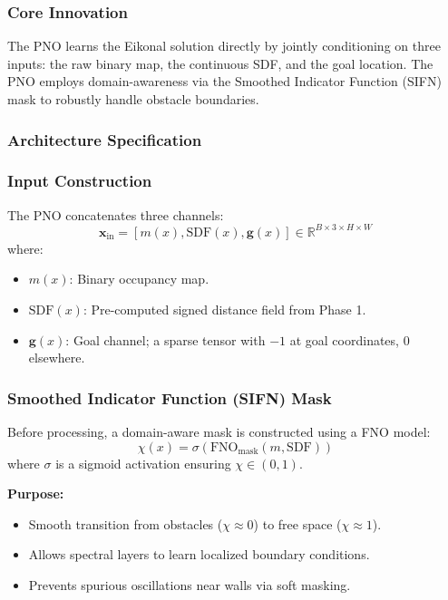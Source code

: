 \documentclass[11pt,a4paper]{article}
\theoremstyle{definition}
\begin{document}
\subsubsection{Core Innovation}
The PNO learns the Eikonal solution directly by jointly conditioning on three inputs:
the raw binary map, the continuous SDF, and the goal location. 
The PNO employs domain-awareness via the Smoothed Indicator Function (SIFN) mask to robustly handle obstacle boundaries.

\subsubsection{Architecture Specification}

\subsubsection{Input Construction}

The PNO concatenates three channels:
\[
  \mathbf{x}_{\text{in}} = [m(x), \text{SDF}(x), \mathbf{g}(x)] \in \mathbb{R}^{B \times 3 \times H \times W}
\]
where:
\begin{itemize}
  \item $m(x)$: Binary occupancy map.
  \item $\text{SDF}(x)$: Pre-computed signed distance field from Phase 1.
  \item $\mathbf{g}(x)$: Goal channel; a sparse tensor with $-1$ at goal coordinates, $0$ elsewhere.
\end{itemize}

\subsubsection{Smoothed Indicator Function (SIFN) Mask}

Before processing, a domain-aware mask is constructed using a FNO model:
\[
  \chi(x) = \sigma(\text{FNO}_{\text{mask}}(m, \text{SDF}))
\]
where $\sigma$ is a sigmoid activation ensuring $\chi \in (0,1)$.

\noindent
\textbf{Purpose:}
\begin{itemize}
  \item Smooth transition from obstacles ($\chi \approx 0$) to free space ($\chi \approx 1$).
  \item Allows spectral layers to learn localized boundary conditions.
  \item Prevents spurious oscillations near walls via soft masking.
\end{itemize}
\end{document}
